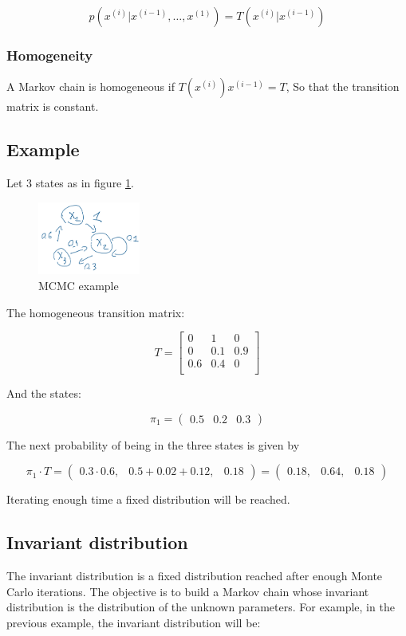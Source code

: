   $$p(x^{(i)}|x^{(i-1)},\dots,x^{(1)})=T(x^{(i)}|x^{(i-1)})$$

    \subsubsection{Homogeneity}
    A Markov chain is homogeneous if $T(x^{(i)})x^{(i-1)}=T$,
    So that the transition matrix is constant.

  \subsection{Example}
  Let $3$ states as in figure \ref{fig:MCMCexample}.

  \begin{figure}[H]
    \centering
    \includegraphics[width=0.3\textwidth]{mcmc.png}
    \caption{MCMC example}
    \label{fig:MCMCexample}
  \end{figure}

  The homogeneous transition matrix:

  $$T = \begin{bmatrix}0 & 1 & 0\\0 & 0.1 & 0.9\\ 0.6 & 0.4 & 0\\\end{bmatrix}$$

  And the states:

  $$\pi_1=\begin{pmatrix}0.5 & 0.2& 0.3 \end{pmatrix}$$

  The next probability of being in the three states is given by

  $$\pi_1 \cdot T=\begin{pmatrix}0.3\cdot0.6, & 0.5+0.02+0.12,& 0.18 \end{pmatrix} = \begin{pmatrix}0.18, & 0.64,& 0.18 \end{pmatrix}$$

  Iterating enough time a fixed distribution will be reached.

  \subsection{Invariant distribution}
  The invariant distribution is a fixed distribution reached after enough Monte Carlo iterations.
  The objective is to build a Markov chain whose invariant distribution is the distribution of the unknown parameters.
  For example, in the previous example, the invariant distribution will be:

